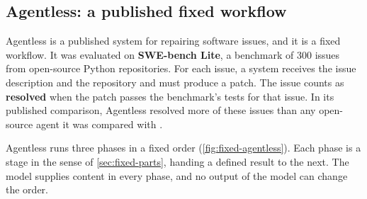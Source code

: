 \subsection{Agentless: a published fixed workflow}
\label{sec:fixed-agentless}

Agentless is a published system for repairing software issues, and it is a fixed workflow. It was
evaluated on \textbf{SWE-bench Lite}, a benchmark of 300 issues from open-source Python
repositories. For each issue, a system receives the issue description and the repository and must
produce a patch. The issue counts as \textbf{resolved} when the patch passes the benchmark's tests
for that issue. In its published comparison, Agentless resolved more of these issues than any
open-source agent it was compared with \citep{xia2025agentless}.

Agentless runs three phases in a fixed order (\cref{fig:fixed-agentless}). Each phase is a stage in
the sense of \cref{sec:fixed-parts}, handing a defined result to the next. The model supplies
content in every phase, and no output of the model can change the order.


